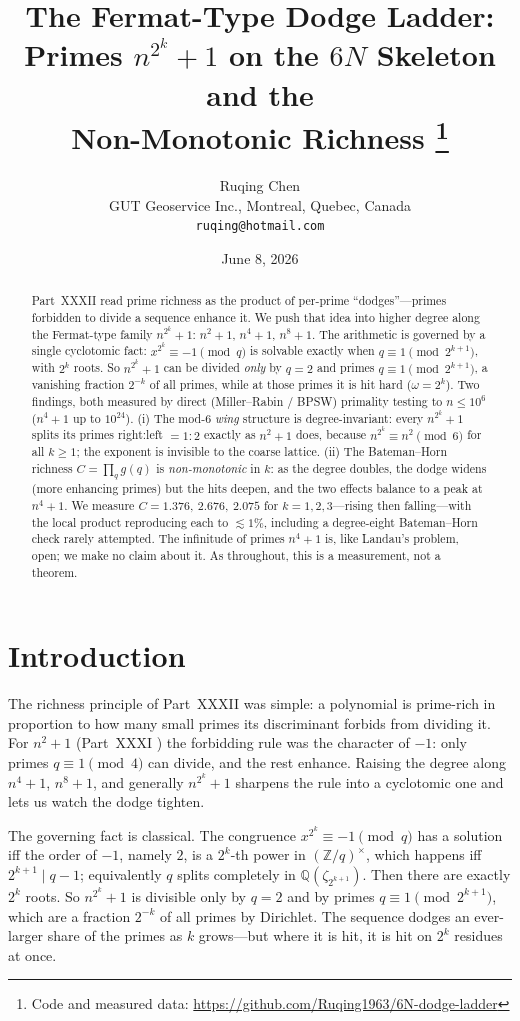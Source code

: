 \documentclass[11pt]{article}
\title{\bf The Fermat-Type Dodge Ladder:\\
Primes $n^{2^k}+1$ on the $6N$ Skeleton and the\\
Non-Monotonic Richness%
\thanks{Code and measured data: \url{https://github.com/Ruqing1963/6N-dodge-ladder}}}
\author{Ruqing Chen\\
\small GUT Geoservice Inc., Montreal, Quebec, Canada\\
\small \texttt{ruqing@hotmail.com}}
\date{June 8, 2026}
\theoremstyle{definition}
\begin{document}
\maketitle

\begin{abstract}
Part~XXXII read prime richness as the product of per-prime ``dodges''---primes forbidden to divide a
sequence enhance it. We push that idea into higher degree along the Fermat-type family
$n^{2^k}+1$: $n^2+1$, $n^4+1$, $n^8+1$. The arithmetic is governed by a single cyclotomic fact:
$x^{2^k}\equiv-1\pmod q$ is solvable exactly when $q\equiv1\pmod{2^{k+1}}$, with $2^k$ roots. So
$n^{2^k}+1$ can be divided \emph{only} by $q=2$ and primes $q\equiv1\pmod{2^{k+1}}$, a vanishing
fraction $2^{-k}$ of all primes, while at those primes it is hit hard ($\omega=2^k$). Two findings,
both measured by direct (Miller--Rabin / BPSW) primality testing to $n\le10^{6}$ ($n^4+1$ up to
$10^{24}$). (i) The mod-$6$ \emph{wing} structure is degree-invariant: every $n^{2^k}+1$ splits its
primes right:left $=1{:}2$ exactly as $n^2+1$ does, because $n^{2^k}\equiv n^2\pmod6$ for all $k\ge1$;
the exponent is invisible to the coarse lattice. (ii) The Bateman--Horn richness $C=\prod_q g(q)$ is
\emph{non-monotonic} in $k$: as the degree doubles, the dodge widens (more enhancing primes) but the
hits deepen, and the two effects balance to a peak at $n^4+1$. We measure $C=1.376,\ 2.676,\ 2.075$ for
$k=1,2,3$---rising then falling---with the local product reproducing each to $\lesssim1\%$, including a
degree-eight Bateman--Horn check rarely attempted. The infinitude of primes $n^4+1$ is, like Landau's
problem, open; we make no claim about it. As throughout, this is a measurement, not a theorem.
\end{abstract}

\section{Introduction}
The richness principle of Part~XXXII \cite{PXXXII} was simple: a polynomial is prime-rich in proportion
to how many small primes its discriminant forbids from dividing it. For $n^2+1$ (Part~XXXI
\cite{PXXXI}) the forbidding rule was the character of $-1$: only primes $q\equiv1\pmod4$ can divide,
and the rest enhance. Raising the degree along $n^4+1$, $n^8+1$, and generally $n^{2^k}+1$ sharpens the
rule into a cyclotomic one and lets us watch the dodge tighten.

The governing fact is classical. The congruence $x^{2^k}\equiv-1\pmod q$ has a solution iff the order
of $-1$, namely $2$, is a $2^k$-th power in $(\mathbb{Z}/q)^\times$, which happens iff
$2^{k+1}\mid q-1$; equivalently $q$ splits completely in $\mathbb{Q}(\zeta_{2^{k+1}})$. Then there are
exactly $2^k$ roots. So $n^{2^k}+1$ is divisible only by $q=2$ and by primes $q\equiv1\pmod{2^{k+1}}$,
which are a fraction $2^{-k}$ of all primes by Dirichlet. The sequence dodges an ever-larger share of
the primes as $k$ grows---but where it is hit, it is hit on $2^k$ residues at once.
\end{document}
